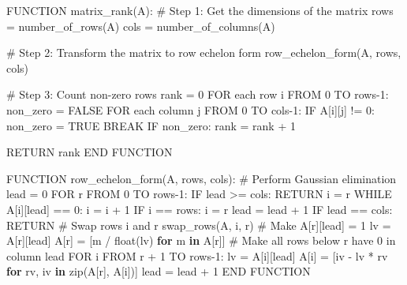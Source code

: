 \documentclass[
  letterpaper,
  DIV=11,
  numbers=noendperiod]{scrreprt}
\newenvironment{Shaded}{\begin{snugshade}}{\end{snugshade}}
\newcommand{\BuiltInTok}[1]{\textcolor[rgb]{0.00,0.23,0.31}{#1}}
\newcommand{\CommentTok}[1]{\textcolor[rgb]{0.37,0.37,0.37}{#1}}
\newcommand{\ControlFlowTok}[1]{\textcolor[rgb]{0.00,0.23,0.31}{\textbf{#1}}}
\newcommand{\DecValTok}[1]{\textcolor[rgb]{0.68,0.00,0.00}{#1}}
\newcommand{\KeywordTok}[1]{\textcolor[rgb]{0.00,0.23,0.31}{\textbf{#1}}}
\newcommand{\NormalTok}[1]{\textcolor[rgb]{0.00,0.23,0.31}{#1}}
\newcommand{\OperatorTok}[1]{\textcolor[rgb]{0.37,0.37,0.37}{#1}}
\theoremstyle{plain}
\theoremstyle{definition}
\theoremstyle{remark}
\begin{document}
\begin{Shaded}
\begin{Highlighting}[]
\NormalTok{FUNCTION matrix\_rank(A):}
    \CommentTok{\# Step 1: Get the dimensions of the matrix}
\NormalTok{    rows }\OperatorTok{=}\NormalTok{ number\_of\_rows(A)}
\NormalTok{    cols }\OperatorTok{=}\NormalTok{ number\_of\_columns(A)}
    
    \CommentTok{\# Step 2: Transform the matrix to row echelon form}
\NormalTok{    row\_echelon\_form(A, rows, cols)}
    
    \CommentTok{\# Step 3: Count non{-}zero rows}
\NormalTok{    rank }\OperatorTok{=} \DecValTok{0}
\NormalTok{    FOR each row i FROM }\DecValTok{0}\NormalTok{ TO rows}\OperatorTok{{-}}\DecValTok{1}\NormalTok{:}
\NormalTok{        non\_zero }\OperatorTok{=}\NormalTok{ FALSE}
\NormalTok{        FOR each column j FROM }\DecValTok{0}\NormalTok{ TO cols}\OperatorTok{{-}}\DecValTok{1}\NormalTok{:}
\NormalTok{            IF A[i][j] }\OperatorTok{!=} \DecValTok{0}\NormalTok{:}
\NormalTok{                non\_zero }\OperatorTok{=}\NormalTok{ TRUE}
\NormalTok{                BREAK}
\NormalTok{        IF non\_zero:}
\NormalTok{            rank }\OperatorTok{=}\NormalTok{ rank }\OperatorTok{+} \DecValTok{1}
    
\NormalTok{    RETURN rank}
\NormalTok{END FUNCTION}

\NormalTok{FUNCTION row\_echelon\_form(A, rows, cols):}
    \CommentTok{\# Perform Gaussian elimination}
\NormalTok{    lead }\OperatorTok{=} \DecValTok{0}
\NormalTok{    FOR r FROM }\DecValTok{0}\NormalTok{ TO rows}\OperatorTok{{-}}\DecValTok{1}\NormalTok{:}
\NormalTok{        IF lead }\OperatorTok{\textgreater{}=}\NormalTok{ cols:}
\NormalTok{            RETURN}
\NormalTok{        i }\OperatorTok{=}\NormalTok{ r}
\NormalTok{        WHILE A[i][lead] }\OperatorTok{==} \DecValTok{0}\NormalTok{:}
\NormalTok{            i }\OperatorTok{=}\NormalTok{ i }\OperatorTok{+} \DecValTok{1}
\NormalTok{            IF i }\OperatorTok{==}\NormalTok{ rows:}
\NormalTok{                i }\OperatorTok{=}\NormalTok{ r}
\NormalTok{                lead }\OperatorTok{=}\NormalTok{ lead }\OperatorTok{+} \DecValTok{1}
\NormalTok{                IF lead }\OperatorTok{==}\NormalTok{ cols:}
\NormalTok{                    RETURN}
        \CommentTok{\# Swap rows i and r}
\NormalTok{        swap\_rows(A, i, r)}
        \CommentTok{\# Make A[r][lead] = 1}
\NormalTok{        lv }\OperatorTok{=}\NormalTok{ A[r][lead]}
\NormalTok{        A[r] }\OperatorTok{=}\NormalTok{ [m }\OperatorTok{/} \BuiltInTok{float}\NormalTok{(lv) }\ControlFlowTok{for}\NormalTok{ m }\KeywordTok{in}\NormalTok{ A[r]]}
        \CommentTok{\# Make all rows below r have 0 in column lead}
\NormalTok{        FOR i FROM r }\OperatorTok{+} \DecValTok{1}\NormalTok{ TO rows}\OperatorTok{{-}}\DecValTok{1}\NormalTok{:}
\NormalTok{            lv }\OperatorTok{=}\NormalTok{ A[i][lead]}
\NormalTok{            A[i] }\OperatorTok{=}\NormalTok{ [iv }\OperatorTok{{-}}\NormalTok{ lv }\OperatorTok{*}\NormalTok{ rv }\ControlFlowTok{for}\NormalTok{ rv, iv }\KeywordTok{in} \BuiltInTok{zip}\NormalTok{(A[r], A[i])]}
\NormalTok{        lead }\OperatorTok{=}\NormalTok{ lead }\OperatorTok{+} \DecValTok{1}
\NormalTok{END FUNCTION}


\end{Highlighting}
\end{Shaded}
\end{document}
